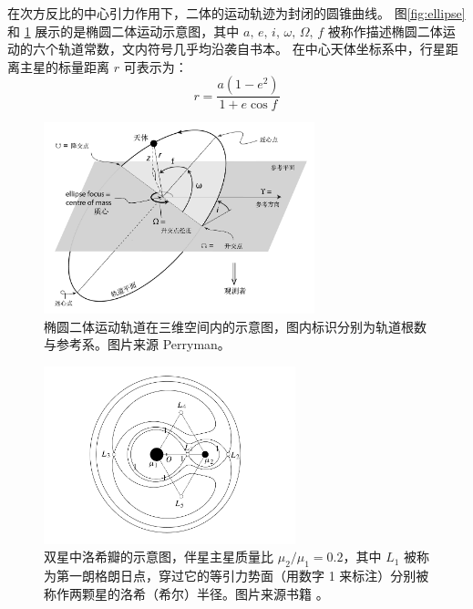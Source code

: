 在次方反比的中心引力作用下，二体的运动轨迹为封闭的圆锥曲线\cite{Newton1687}。
图\ref{fig:ellipse} 和 \ref{fig:3dorbit} 展示的是椭圆二体运动示意图，其中 $a,\,e,\,i,\,\omega,\,\Omega,\,f$ 
被称作描述椭圆二体运动的六个轨道常数，文内符号几乎均沿袭自书本。
在中心天体坐标系中，行星距离主星的标量距离 $r$ 可表示为：
\begin{equation} \label{radialdistance}
r = \frac{a(1-e^2)}{1+e\cos f}
\end{equation} 

\begin{figure}[t]
\centering
\includegraphics[width=0.70\textwidth]{figures/appendix/f2_3dorbit.pdf}
\caption{椭圆二体运动轨道在三维空间内的示意图，图内标识分别为轨道根数与参考系。图片来源 Perryman。}
\label{fig:3dorbit}
\end{figure}

\begin{figure}[hb!]
\centering
\includegraphics[width=0.65\textwidth]{figures/appendix/f3_rochelimit.pdf}
\caption[双星中洛希瓣的示意图，伴星主星质量比 $\mu_2/\mu_1 = 0.2$，其中 $L_1$ 被称为第一朗格朗日点，穿过它的等引力势面（用数字 1 来标注）分别被称作两颗星的洛希半径。图片版权 C. D. Murray，S. F. Dermott]{双星中洛希瓣的示意图，伴星主星质量比 $\mu_2/\mu_1 = 0.2$，其中 $L_1$ 被称为第一朗格朗日点，穿过它的等引力势面（用数字 1 来标注）分别被称作两颗星的洛希（希尔）半径。图片来源书籍 。}
\label{fig:rocher}
\end{figure}

